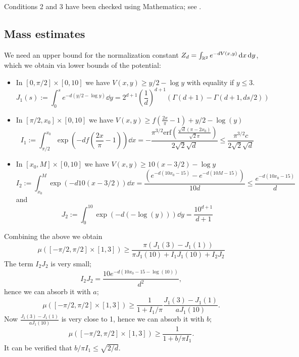 Conditions 2 and 3 have been checked using Mathematica; see .

\subsection{Mass estimates}

We need an upper bound for the normalization constant $Z_d = \int_{\mathbb{R}^2} e^{-d V(x,y)} \dd{x} \dd{y}$, which we obtain via lower bounds of the potential:
    \begin{itemize}
        \item In $[0, \pi/2] \times [0,10]$ we have $V(x,y) \ge y/2 - \log y$ with equality if $y \le 3$.
        $$J_1(s) := \int_0^s e^{-d(y/2 - \log y)} \dd{y} = 2^{d+1} \left(\frac{1}{d}\right)^{d+1} (\Gamma (d+1)-\Gamma (d+1,d s/2))$$
        \item In $[\pi/2, x_0] \times [0,10]$ we have $V(x,y) \ge f\left(\frac{2 x}{\pi}-1\right) + y/2 - \log(y)$
        $$I_1 := \int_{\pi/2}^{x_0} \exp(-d f\left(\frac{2 x}{\pi }-1\right)) \dd{x} = -\frac{\pi ^{3/2} \text{erf}\left(\frac{\sqrt{d} (\pi -2 x_0)}{\sqrt{2} \pi }\right)}{2 \sqrt{2} \sqrt{d}} \le  \frac{\pi^{3/2} c}{2 \sqrt{2} \sqrt{d}}$$
        \item In $[x_0, M] \times [0,10]$ we have $V(x,y) \ge 10(x-3/2) - \log y$
        $$I_2 :=  \int_{x_0}^{M} \exp(-d 10 (x-3/2)) \dd{x} = \frac{\left(e^{-d(10x_0-15)}-e^{-d(10 M - 15)}\right)}{10 d} \le \frac{e^{-d(10x_0-15)}}{d}$$
        and
        $$J_2 := \int_{0}^{10} \exp(-d \left(-\log (y)\right)) \dd{y} = \frac{10^{d+1}}{d+1}$$
    \end{itemize}
    Combining the above we obtain
    $$
        \mu([-\pi/2,\pi/2] \times [1,3]) \ge \frac{\pi (J_1(3)-J_1(1))}{\pi J_1(10) + I_1 J_1(10) + I_2 J_2}
    $$
    The term $I_2 J_2$ is very small;
    $$
        I_2 J_2 = \frac{10 e^{-d(10x_0-15-\log(10))}}{d^2},
    $$
    hence we can absorb it with $a$;
    $$
        \mu([-\pi/2,\pi/2] \times [1,3])  \ge \frac{1}{1  + I_1/\pi } \frac{J_1(3)-J_1(1)}{aJ_1(10)}.
    $$
    Now $\frac{J_1(3)-J_1(1)}{aJ_1(10)}$ is very close to 1, hence we can absorb it with $b$;
    $$
        \mu([-\pi/2,\pi/2] \times [1,3])  \ge \frac{1}{1  + b/\pi I_1}.
    $$
    It can be verified that $b/\pi I_1 \le \sqrt{2/d}$.

